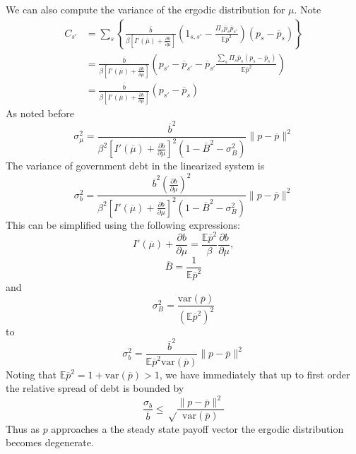 \documentclass[12pt]{article}
\newcommand{\EE}{\mathbb E}
\newcommand{\barB}{{\overline B}}
\newcommand{\pbar}{{\overline p}}
\newcommand{\bbar}{{\overline b}}
\newcommand{\mubar}{{\overline \mu}}
\newcommand{\var}{{\text{var}}}
\begin{document}
We can also compute the variance of the ergodic distribution for $\mu$.  Note 
\[
\begin{split}
	C_{s'} &= \sum_s\left\{\frac{\bbar}{\beta\left[I'(\mubar)+\frac{\partial b}{\partial\mu}\right]}\left(1_{s,s'}-\frac{\Pi_s \pbar_s\pbar_{s'}}{\EE\pbar^2}\right)({p}_s-\pbar_s) \right\}\\
		 &=\frac{\bbar}{\beta\left[I'(\mubar)+\frac{\partial b}{\partial\mu}\right]}\left( p_{s'}-\pbar_{s'} -\pbar_{s'}\frac{\sum_s\Pi_s\pbar_s( p_s-\pbar_s)}{\EE\pbar^2}\right)\\
		&= \frac{\bbar}{\beta\left[I'(\mubar)+\frac{\partial b}{\partial\mu}\right]}( p_{s'}-\pbar_{s})
\end{split}
\]  As noted before
\[
	\sigma_{\mu}^2 = \frac{\bbar^2}{\beta^2\left[I'(\mubar)+\frac{\partial b}{\partial\mu}\right]^2\left(1-\barB^2-\sigma_B^2\right)}\| p-\pbar\|^2
\]  The variance of government debt in the linearized system is 
\[
	\sigma_b^2 = \frac{\bbar^2\left(\frac{\partial b}{\partial\mu}\right)^2}{\beta^2\left[I'(\mubar)+\frac{\partial b}{\partial\mu}\right]^2\left(1-\barB^2-\sigma_B^2\right)}\| p-\pbar\|^2
\]  This can be simplified using the following expressions: 
\[
	I'(\mubar)+\frac{\partial b}{\partial \mu} = \frac{\EE\pbar^2}{\beta}\frac{\partial b}{\partial\mu},
\]
\[
	\barB = \frac{1}{\EE\pbar^2}
\]and
\[
	\sigma_B^2 = \frac{\var(\pbar)}{(\EE\pbar^2)^2}
\] to
\begin{equation}
	\sigma^2_b = \frac{\bbar^2}{\EE\pbar^2\var(\pbar)}\|p-\pbar\|^2
\end{equation}Noting that $\EE\pbar^2 = 1 +\var(\pbar) > 1$, we have immediately that up to first order the relative spread of debt is bounded by
\begin{equation}
	\frac{\sigma_b}{\bbar} \leq \sqrt\frac{\|p-\pbar\|^2}{\var(\pbar)}
\end{equation}  Thus as $p$ approaches a the steady state payoff vector the ergodic distribution becomes degenerate.
\end{document}
